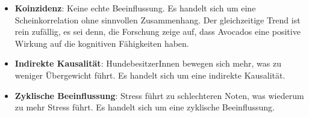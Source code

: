 \begin{myexercise}
\begin{myanswer}
\begin{itemize}
            \item \textbf{Koinzidenz}: Keine echte Beeinflussung. Es handelt sich um eine Scheinkorrelation ohne sinnvollen Zusammenhang. Der gleichzeitige Trend ist rein zufällig, es sei denn, die Forschung zeige auf, dass Avocados eine positive Wirkung auf die kognitiven Fähigkeiten haben.
                  \begin{center}
                  \end{center}

            \item \textbf{Indirekte Kausalität}: HundebesitzerInnen bewegen sich mehr, was zu weniger Übergewicht führt. Es handelt sich um eine indirekte Kausalität.
                  \begin{center}
                  \end{center}

            \item \textbf{Zyklische Beeinflussung}: Stress führt zu schlechteren Noten, was wiederum zu mehr Stress führt. Es handelt sich um eine zyklische Beeinflussung.
                  \begin{center}
                  \end{center}
        \end{itemize}
    \end{myanswer}
\end{myexercise}

